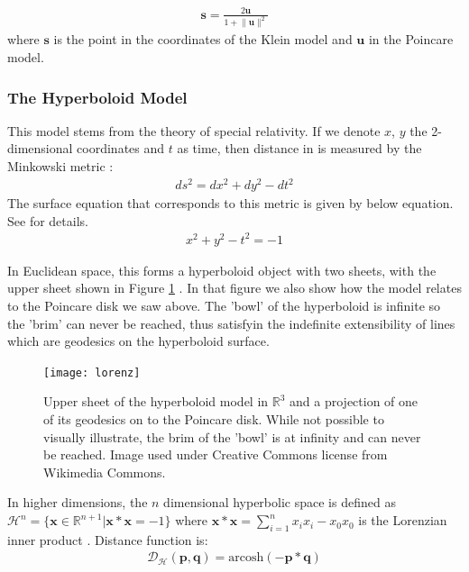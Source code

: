\documentclass[12pt]{report}
\begin{document}
\begin{align}
  \mathbf{s} = \frac{2\mathbf{u}}{1 + \lVert \mathbf{u} \rVert^2}
  \label{eq:p2k}
\end{align}
where $\mathbf{s}$ is the point in the coordinates of the Klein model and $\mathbf{u}$ in the Poincare model.



\subsubsection{The Hyperboloid Model}
This model stems from the theory of special relativity. If we denote $x$, $y$ the 2-dimensional coordinates and $t$ as time, then distance in is measured by the Minkowski metric \cite{Greenberg1994}:
\begin{align*}
  ds^2 = dx^2 + dy^2 - dt^2
\end{align*}
The surface equation that corresponds to this metric is given by below equation. See \cite{Greenberg1994} for details.
\begin{align*}
  x^2 + y^2 - t^2 = -1 
\end{align*}

In Euclidean space, this forms a hyperboloid object with two sheets, with the upper sheet shown in Figure \ref{fig:lorenz} \cite{Greenberg1994}. In that figure we also show how the model relates to the Poincare disk we saw above. The 'bowl' of the hyperboloid is infinite so the 'brim' can never be reached, thus satisfyin the indefinite extensibility of lines which are geodesics on the hyperboloid surface.

\begin{figure}
  \centering
	\texttt{[image: lorenz]}
	\caption{Upper sheet of the hyperboloid model in $\mathbb{R}^3$ and a projection of one of its geodesics on to the Poincare disk. While not possible to visually illustrate, the brim of the 'bowl' is at infinity and can never be reached. Image used under Creative Commons license from Wikimedia Commons.}
	\label{fig:lorenz}
\end{figure}

In higher dimensions, the $n$ dimensional hyperbolic space is defined as $\mathcal{H}^n = \{\mathbf{x} \in \mathbb{R}^{n+1} | \mathbf{x} * \mathbf{x}=-1 \}$ where $\mathbf{x} * \mathbf{x} = \sum_{i=1}^n x_i x_i - x_0 x_0$ is the Lorenzian inner product \cite{Nickel2018} \cite{Cannon}. Distance function is:
\begin{align}
  \mathcal{D_H(\mathbf{p}, \mathbf{q})} = \text{arcosh}(-\mathbf{p} * \mathbf{q})
\end{align}
\end{document}
